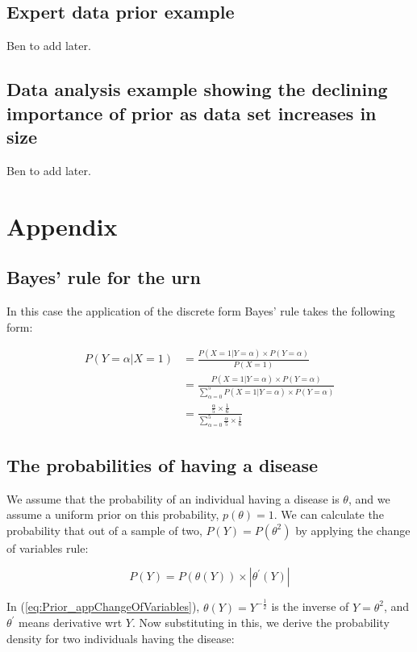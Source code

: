 \documentclass[11pt,fullpage]{book}
\begin{document}
\subsection{Expert data prior example}
Ben to add later.

\subsection{Data analysis example showing the declining importance of prior as data set increases in size}
Ben to add later.

\section{Appendix}
\subsection{Bayes' rule for the urn}\label{app:Prior_bayesUrn}
In this case the application of the discrete form Bayes' rule takes the following form:

\begin{equation}\label{eq:Prior_bayesDiscreteForm}
\begin{align}
P(Y=\alpha|X=1) &= \frac{P(X=1|Y=\alpha)\times P(Y=\alpha)}{P(X=1)}\\
&= \frac{P(X=1|Y=\alpha)\times P(Y=\alpha)}{\sum\limits_{\alpha=0}^{5}P(X=1|Y=\alpha)\times P(Y=\alpha)}\\
&= \frac{\frac{\alpha}{5}\times \frac{1}{6}}{\sum\limits_{\alpha=0}^{5}\frac{\alpha}{5}\times\frac{1}{6}}
\end{align}
\end{equation}

\subsection{The probabilities of having a disease}\label{app:Prior_diseaseJeffreys}
We assume that the probability of an individual having a disease is $\theta$, and we assume a uniform prior on this probability, $p(\theta)=1$. We can calculate the probability that out of a sample of two, $P(Y)=P(\theta^2)$ by applying the change of variables rule:

\begin{equation}\label{eq:Prior_appChangeOfVariables}
P(Y) = P(\theta(Y))\times |\theta^\prime(Y)|
\end{equation}

In (\ref{eq:Prior_appChangeOfVariables}), $\theta(Y)=Y^{-\frac{1}{2}}$ is the inverse of $Y=\theta^2$, and $\theta^\prime$ means derivative wrt $Y$. Now substituting in this, we derive the probability density for two individuals having the disease:
\end{document}
